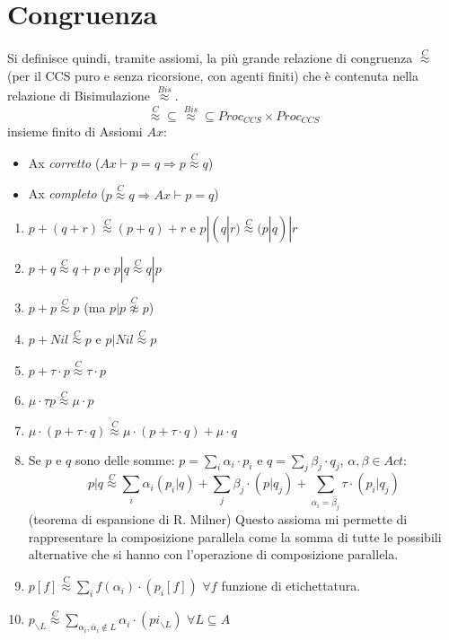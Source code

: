 \section{Congruenza}
Si definisce quindi, tramite assiomi, la più grande relazione di congruenza $\stackrel{C}{\approx}$ (per il CCS puro e senza ricorsione, con agenti finiti) che è contenuta nella relazione di Bisimulazione $\stackrel{Bis}{\approx}$. $$\stackrel{C}{\approx} \subseteq \stackrel{Bis}{\approx} \subseteq Proc_{CCS} \times Proc_{CCS}$$ insieme finito di Assiomi $Ax$:
\begin{itemize}
    \item Ax \textit{corretto} ($Ax \vdash p = q \Rightarrow p \stackrel{C}{\approx} q$)
    \item Ax \textit{completo} ($p \stackrel{C}{\approx} q \Rightarrow Ax \vdash p = q$)
\end{itemize}
\begin{enumerate}
    \item $p + (q + r) \stackrel{C}{\approx} (p + q) + r$ e $p | (q | r) \stackrel{C}{\approx} (p | q) | r$
    \item $p + q \stackrel{C}{\approx} q + p$ e $p | q \stackrel{C}{\approx} q | p$
    \item $p + p \stackrel{C}{\approx} p$ (ma $p | p \stackrel{C}{\not\approx} p$)
    \item $p + Nil \stackrel{C}{\approx} p$ e $p | Nil \stackrel{C}{\approx} p$
    \item $p + \tau \cdot p \stackrel{C}{\approx} \tau \cdot p$
    \item $\mu \cdot \tau p \stackrel{C}{\approx} \mu \cdot p$
    \item $\mu \cdot (p + \tau \cdot q) \stackrel{C}{\approx} \mu \cdot (p + \tau \cdot q) + \mu \cdot q$
    \item Se $p$ e $q$ sono delle somme: $p = \sum_{i} \alpha_i \cdot p_i$ e $q = \sum_{j} \beta_j \cdot q_j$,  $\alpha, \beta \in Act$: $$p | q \stackrel{C}{\approx} \sum_{i} \alpha_i (p_{i} | q) + \sum_{j} \beta_{j} \cdot (p|q_{j}) + \sum_{\alpha_i = \overline{\beta}_{j}} \tau \cdot (p_{i} | q_{j})$$ (teorema di espansione di R. Milner) Questo assioma mi permette di rappresentare la composizione parallela come la somma di tutte le possibili alternative che si hanno con l'operazione di composizione parallela.
    \item $p[f] \stackrel{C}{\approx} \sum_{i} f(\alpha_i) \cdot (p_{i} [f])$ $\forall f$ funzione di etichettatura.
    \item $p_{\backslash L} \stackrel{C}{\approx} \sum_{\alpha_i,\overline{\alpha}_i \not\in L} \alpha_i \cdot (pi_{\backslash L})$ $\forall L \subseteq A$
\end{enumerate}